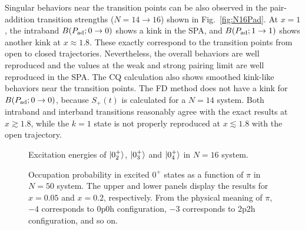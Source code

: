 \documentclass[%
superscriptaddress,
preprint,
showpacs,
nofootinbib,
amsmath,amssymb,
prc,
floatfix ]%
{revtex4-1}
\begin{document}
Singular behaviors near the transition points can be also observed in
the pair-addition transition strengths ($N=14\rightarrow 16$) shown
in Fig.~\ref{fig:N16Pad}. 
At $x=1$, the intraband $B(P_{\rm ad}; 0\rightarrow 0)$ shows a kink
in the SPA,
and $B(P_{\rm ad}; 1\rightarrow 1)$ shows another kink at $x\approx 1.8$.
These exactly correspond to the transition points from open to closed
trajectories.
Nevertheless, the overall behaviors are well reproduced and
the values at the weak and strong pairing limit are well reproduced
in the SPA.
The CQ calculation also shows smoothed kink-like behaviors near the
transition points.
The FD method does not have a kink for $B(P_{\rm ad}; 0\rightarrow 0)$,
because $S_+(t)$ is calculated for a $N=14$ system.
Both intraband and interband transitions reasonably agree with
the exact results at $x\gtrsim 1.8$,
while the $k=1$ state is not properly reproduced at $x\lesssim 1.8$
with the open trajectory.


\begin{figure}[htbp]
 \begin{center}
 \end{center}
 \caption{Excitation energies of $\ket{0_2^+}$, $\ket{0_3^+}$ and $\ket{0_4^+}$ in $N=16$ system.}
 \label{fig:N16energy}
\end{figure}

\begin{figure}[htbp]
 \begin{minipage}{1\hsize}
 \begin{center}
 \end{center}
 \end{minipage}
 \begin{minipage}{1\hsize}
 \begin{center}
 \end{center}
 \end{minipage}
 \caption{Occupation probability in excited $0^+$ states as a function of $\pi$ in $N=50$ system. The upper and lower panels display the results for $x=0.05$ and $x=0.2$, respectively. From the physical meaning of $\pi$, $-4$ corresponds to 0p0h configuration, $-3$ corresponds to 2p2h configuration, and so on.}
 \label{fig:N16_occ}
\end{figure}
\end{document}
